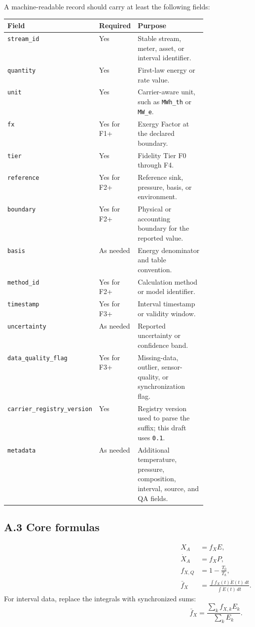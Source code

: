 \documentclass[11pt]{article}
\newcommand{\fx}{f_X}
\begin{document}
A machine-readable record should carry at least the following fields:
\begin{center}
\begin{tabularx}{0.96\linewidth}{@{}p{0.32\linewidth}p{0.15\linewidth}X@{}}
\toprule
Field & Required & Purpose \\
\midrule
\texttt{stream\_id} & Yes & Stable stream, meter, asset, or interval identifier. \\
\texttt{quantity} & Yes & First-law energy or rate value. \\
\texttt{unit} & Yes & Carrier-aware unit, such as \texttt{MWh\_th} or \texttt{MW\_e}. \\
\texttt{fx} & Yes for F1+ & Exergy Factor at the declared boundary. \\
\texttt{tier} & Yes & Fidelity Tier F0 through F4. \\
\texttt{reference} & Yes for F2+ & Reference sink, pressure, basis, or environment. \\
\texttt{boundary} & Yes for F2+ & Physical or accounting boundary for the reported value. \\
\texttt{basis} & As needed & Energy denominator and table convention. \\
\texttt{method\_id} & Yes for F2+ & Calculation method or model identifier. \\
\texttt{timestamp} & Yes for F3+ & Interval timestamp or validity window. \\
\texttt{uncertainty} & As needed & Reported uncertainty or confidence band. \\
\texttt{data\_quality\_flag} & Yes for F3+ & Missing-data, outlier, sensor-quality, or synchronization flag. \\
\texttt{carrier\_registry\_version} & Yes & Registry version used to parse the suffix; this draft uses \texttt{0.1}. \\
\texttt{metadata} & As needed & Additional temperature, pressure, composition, interval, source, and QA fields. \\
\bottomrule
\end{tabularx}
\end{center}

\subsection*{A.3 Core formulas}

\begin{align}
X_A &= \fx E, \\
\dot{X}_A &= \fx P, \\
f_{X,Q} &= 1-\frac{T_0}{T_h}, \\
\bar{f}_X &= \frac{\int f_X(t)\dot{E}(t)\,dt}{\int \dot{E}(t)\,dt}.
\end{align}
For interval data, replace the integrals with synchronized sums:
\begin{equation}
\bar{f}_X=\frac{\sum_k f_{X,k} E_k}{\sum_k E_k}.
\end{equation}
\end{document}
